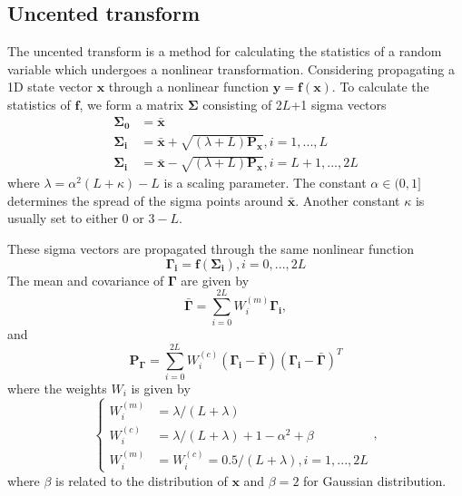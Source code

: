 \documentclass[12pt]{article}
\begin{document}
\subsection{Uncented transform}
The uncented transform is a method for calculating the statistics of a random variable which undergoes a nonlinear transformation. Considering propagating a 1D state vector \(\mathbf{x}\) through a nonlinear function \(\mathbf{y} = \mathbf{f}(\mathbf{x})\). To calculate the statistics of \(\mathbf{f}\), we form a matrix \(\mathbf{\Sigma}\) consisting of 2$L$+1 sigma vectors \cite{Wan}
%
\begin{align} \label{eq:UK_start}
	\mathbf{\Sigma_0} &= \mathbf{\bar{x}} \\
	\mathbf{\Sigma_i} &= \mathbf{\bar{x}} + \sqrt{(\lambda + L)\mathbf{P_{x}}}, i=1,...,L \\
	\mathbf{\Sigma_i} &= \mathbf{\bar{x}} - \sqrt{(\lambda + L)\mathbf{P_{x}}}, i=L+1,...,2L
\end{align}
%
where \(\lambda = \alpha^{2}(L + \kappa) - L\) is a scaling parameter. The constant $\alpha \in (0, 1]$ determines the spread of the sigma points around \(\mathbf{\bar{x}}\). Another constant $\kappa$ is usually set to either 0 or $3 - L$.

These sigma vectors are propagated through the same nonlinear function
%
\begin{equation}
	\mathbf{\Gamma_i} = \mathbf{f}(\mathbf{\Sigma_i}), i = 0,...,2L
\end{equation}
%
The mean and covariance of \(\mathbf{\Gamma}\) are given by
%
\begin{equation}
	\mathbf{\bar{\Gamma}} = \sum_{i=0}^{2L} W^{(m)}_i \mathbf{\Gamma_i},
\end{equation}
%
and
\begin{equation}
	\mathbf{P_\Gamma} = \sum_{i=0}^{2L} W^{(c)}_i (\mathbf{\Gamma_i} - \mathbf{\bar{\Gamma}}) (\mathbf{\Gamma_i} - \mathbf{\bar{\Gamma}})^T
\end{equation}
%
where the weights $W_i$ is given by
%
\begin{equation} \label{eq:UK_end}
	\begin{cases}
		W^{(m)}_i &= \lambda / (L + \lambda) \\
		W^{(c)}_i &= \lambda / (L + \lambda) + 1 - \alpha^2 + \beta \\
		W_i^{(m)} &= W_i^{(c)} = 0.5/(L + \lambda), i=1,...,2L
	\end{cases}
	,
\end{equation}
%
where $\beta$ is related to the distribution of \(\mathbf{x}\) and $\beta=2$ for Gaussian distribution.
\end{document}
